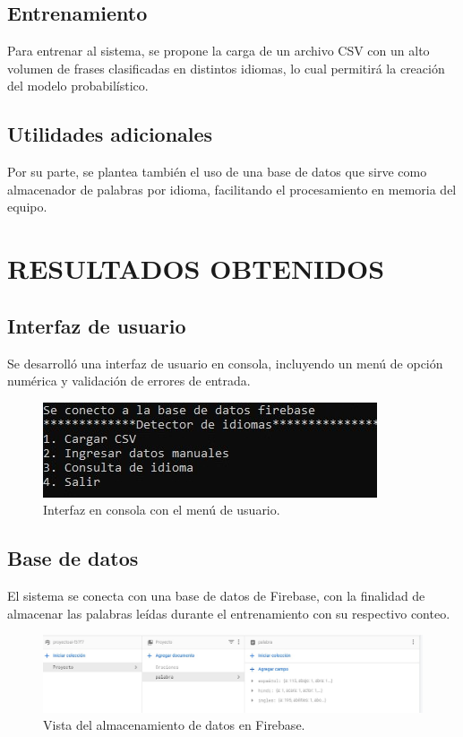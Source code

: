\documentclass[sigconf]{acmart}
\begin{document}
\subsection{Entrenamiento}
Para entrenar al sistema, se propone la carga de un archivo CSV con un alto volumen de frases clasificadas en distintos idiomas, lo cual permitirá la creación del modelo probabilístico.

\subsection{Utilidades adicionales}
Por su parte, se plantea también el uso de una base de datos que sirve como almacenador de palabras por idioma, facilitando el procesamiento en memoria del equipo.

\section{RESULTADOS OBTENIDOS}
\subsection{Interfaz de usuario}
Se desarrolló una interfaz de usuario en consola, incluyendo un menú de opción numérica y validación de errores de entrada.

\begin{figure}[h]
  \centering
  \includegraphics[width=\linewidth]{menu}
  \caption{Interfaz en consola con el menú de usuario.}
\end{figure}

\subsection{Base de datos}
El sistema se conecta con una base de datos de Firebase, con la finalidad de almacenar las palabras leídas durante el entrenamiento con su respectivo conteo.

\begin{figure}[h]
  \centering
  \includegraphics[width=\linewidth]{bd}
  \caption{Vista del almacenamiento de datos en Firebase.}
\end{figure}
\end{document}
